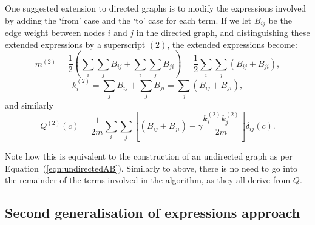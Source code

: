\documentclass{article}
\begin{document}
One suggested extension to directed graphs is to modify the expressions 
involved by adding the `from' case and the `to' case for each term. 
If we let $B_{ij}$ be the edge weight between nodes $i$ and $j$ in 
the directed graph, and distinguishing these extended expressions by 
a superscript $(2)$, the extended expressions become:
\begin{equation}
m^{(2)} = \frac{1}{2}\left ( \sum_i\sum_jB_{ij} + \sum_i\sum_jB_{ji}\right)  = \frac{1}{2}\sum_i\sum_j \left( B_{ij} + B_{ji} \right) ,
\end{equation}
\begin{equation}
k_i^{(2)} = \sum_jB_{ij} + \sum_jB_{ji} = \sum_j{\left( B_{ij} + B_{ji} \right)},
\end{equation}
and similarly
\begin{equation}
	Q^{(2)}(c) = \frac{1}{2m}\sum_i\sum_j\left[ \left( B_{ij} + B_{ji} \right) - \gamma \frac{k_i^{(2)}k_j^{(2)}}{2m} \right] \delta_{ij}(c).
\end{equation}

Note how this is equivalent to the construction of an undirected graph as 
per Equation~(\ref{eqn:undirectedAB}). Similarly to above, 
there is no need to go into the remainder of the terms 
involved in the algorithm, as they all derive from $Q$.


\subsection{Second generalisation of expressions approach}
\end{document}
